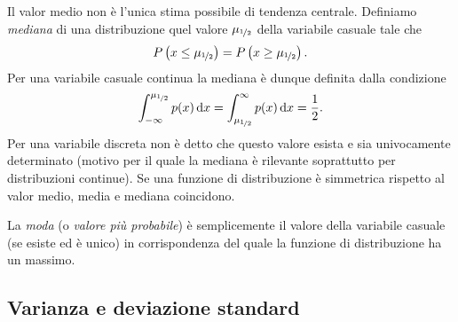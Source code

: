 Il valor medio non è l'unica stima possibile di tendenza centrale. Definiamo
{\itshape mediana} di una distribuzione quel valore $\mu_{\nicefrac{1}{2}}$ della variabile
casuale tale che
\begin{align}\label{eq:median}
  \displaystyle P\left(x \le \mu_{\nicefrac{1}{2}}\right) = \displaystyle P\left(x \ge \mu_{\nicefrac{1}{2}}\right).
\end{align}
Per una variabile casuale continua la mediana è dunque definita dalla
condizione
\begin{align*}
  \int_{-\infty}^{\mu_{\nicefrac{1}{2}}} p(x) \,\mathrm{d}{x} =
  \int_{\mu_{\nicefrac{1}{2}}}^{\infty} p(x) \,\mathrm{d}{x} = \frac{1}{2}.
\end{align*}
Per una variabile discreta non è detto che questo valore esista e sia
univocamente determinato (motivo per il quale la mediana è rilevante
soprattutto per distribuzioni continue). Se una funzione di distribuzione è
simmetrica rispetto al valor medio, media e mediana coincidono.


La \emph{moda} (o \emph{valore più probabile}) è semplicemente il valore
della variabile casuale (se esiste ed è unico) in corrispondenza del quale la
funzione di distribuzione ha un massimo.


\subsection{Varianza e deviazione standard}

